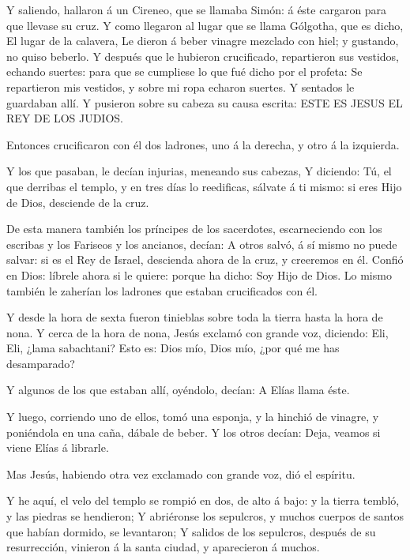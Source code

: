  Y saliendo, hallaron á un Cireneo, que se llamaba Simón: á
éste cargaron para que llevase su cruz.  Y como llegaron al
lugar que se llama Gólgotha, que es dicho, El lugar de la calavera,
 Le dieron á beber vinagre mezclado con hiel; y gustando,
no quiso beberlo.  Y después que le hubieron crucificado,
repartieron sus vestidos, echando suertes: para que se cumpliese lo que
fué dicho por el profeta: Se repartieron mis vestidos, y sobre mi ropa
echaron suertes.  Y sentados le guardaban allí.
 Y pusieron sobre su cabeza su causa escrita: ESTE ES JESUS
EL REY DE LOS JUDIOS.

 Entonces crucificaron con él dos ladrones, uno á la
derecha, y otro á la izquierda.

 Y los que pasaban, le decían injurias, meneando sus
cabezas,  Y diciendo: Tú, el que derribas el templo, y en
tres días lo reedificas, sálvate á ti mismo: si eres Hijo de Dios,
desciende de la cruz.

 De esta manera también los príncipes de los sacerdotes,
escarneciendo con los escribas y los Fariseos y los ancianos, decían:
 A otros salvó, á sí mismo no puede salvar: si es el Rey de
Israel, descienda ahora de la cruz, y creeremos en él. 
Confió en Dios: líbrele ahora si le quiere: porque ha dicho: Soy Hijo de
Dios.  Lo mismo también le zaherían los ladrones que
estaban crucificados con él.

 Y desde la hora de sexta fueron tinieblas sobre toda la
tierra hasta la hora de nona.  Y cerca de la hora de nona,
Jesús exclamó con grande voz, diciendo: Eli, Eli, ¿lama sabachtani? Esto
es: Dios mío, Dios mío, ¿por qué me has desamparado?

 Y algunos de los que estaban allí, oyéndolo, decían: A
Elías llama éste.

 Y luego, corriendo uno de ellos, tomó una esponja, y la
hinchió de vinagre, y poniéndola en una caña, dábale de beber.
 Y los otros decían: Deja, veamos si viene Elías á
librarle.

 Mas Jesús, habiendo otra vez exclamado con grande voz, dió
el espíritu.

 Y he aquí, el velo del templo se rompió en dos, de alto á
bajo: y la tierra tembló, y las piedras se hendieron;  Y
abriéronse los sepulcros, y muchos cuerpos de santos que habían dormido,
se levantaron;  Y salidos de los sepulcros, después de su
resurrección, vinieron á la santa ciudad, y aparecieron á muchos.

